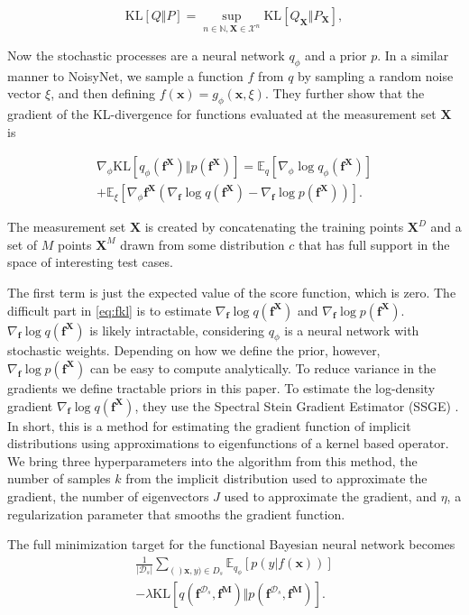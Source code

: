 \documentclass[]{uai2021} %
\newcommand{\E}{\mathbb{E}}
\newcommand{\N}{\mathbb{N}}
\newcommand{\D}{\mathcal{D}}
\newcommand{\X}{\mathbf{X}}
\newcommand{\f}{\mathbf{f}}
\newcommand{\KL}{\mathrm{KL}}
\begin{document}
\begin{equation}
    \KL[Q \Vert P] = \sup_{n \in \N, \X \in \mathcal{X}^n} \KL \left[ Q_\X \Vert P_\X \right],
\end{equation}

Now the stochastic processes are a neural network \(q_\phi\) and a prior \(p\). In a similar
manner to NoisyNet, we sample a function \(f\) from \(q\) by sampling a random noise vector
\(\xi\), and then defining \(f(\bm{x}) = g_\phi(\bm{x}, \xi)\). They further show that the
gradient of the KL-divergence for functions evaluated at the measurement set \(\X\) is

\begin{multline}\label{eq:fkl}
    \nabla_\phi \KL[q_\phi(\f^\X) \Vert p(\f^\X)] = \E_q \left[ \nabla_\phi \log q_\phi (\f^\X) \right]\\
    + \E_\xi \left[ \nabla_\phi \f^\X( \nabla_\f \log q(\f^\X) - \nabla_\f \log p(\f^\X)) \right].
\end{multline}

The measurement set \(\X\) is created by concatenating the training points \(\X^D\) and a
set of \(M\) points \(\X^M\) drawn from some distribution \(c\) that has full support
in the space of interesting test cases. 

The first term is just the expected value of the score function, which is zero.
The difficult part in \eqref{eq:fkl} is to estimate \(\nabla_\f \log q(\f^\X)\)
and \(\nabla_\f \log p(\f^\X)\). \(\nabla_\f \log q(\f^\X)\) is likely 
intractable, considering \(q_\phi\) is a neural network with stochastic weights.
Depending on how we define the prior, however, \(\nabla_\f \log p(\f^\X)\)
can be easy to compute analytically. To reduce variance in the gradients we
define tractable priors in this paper. To estimate the log-density gradient
\(\nabla_\f \log q(\f^\X)\), they use the Spectral Stein Gradient Estimator (SSGE)
\citep{shi_spectral_2018}. In short, this is a method for estimating the gradient
function of implicit distributions using approximations to eigenfunctions of a 
kernel based operator. We bring three hyperparameters into the algorithm from this
method, the number of samples \(k\) from the implicit distribution used to approximate
the gradient, the number of eigenvectors \(J\) used to approximate the gradient, and
\(\eta\), a regularization parameter that smooths the gradient function.

The full minimization target for the functional Bayesian neural network becomes
\begin{multline}
    {\frac{1}{\lvert \D_s \rvert}} \sum_{()\bm{x}, y) \in D_s} \E_{q_\phi}
    \left[ p(y \vert f(\bm{x})) \right]\\ - \lambda \KL
    \left[ q(\f^{\D_s}, \f^\mathbf{M}) \Vert p(\f^{\D_s}, \f^\mathbf{M}) \right].
\end{multline}
\end{document}
